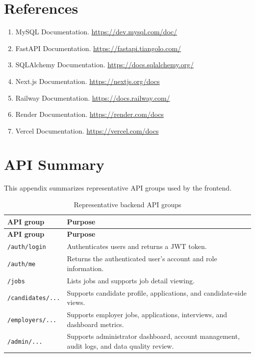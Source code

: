 \documentclass[12pt,a4paper]{report}
\begin{document}
\chapter*{References}

\begin{enumerate}[leftmargin=1.5cm]
  \item MySQL Documentation. \url{https://dev.mysql.com/doc/}
  \item FastAPI Documentation. \url{https://fastapi.tiangolo.com/}
  \item SQLAlchemy Documentation. \url{https://docs.sqlalchemy.org/}
  \item Next.js Documentation. \url{https://nextjs.org/docs}
  \item Railway Documentation. \url{https://docs.railway.com/}
  \item Render Documentation. \url{https://render.com/docs}
  \item Vercel Documentation. \url{https://vercel.com/docs}
\end{enumerate}

\appendix
\chapter{API Summary}

This appendix summarizes representative API groups used by the frontend.

\begin{longtable}{L{0.30\textwidth}L{0.60\textwidth}}
\caption{Representative backend API groups}\\
\toprule
\textbf{API group} & \textbf{Purpose} \\
\midrule
\endfirsthead
\toprule
\textbf{API group} & \textbf{Purpose} \\
\midrule
\endhead
\texttt{/auth/login} & Authenticates users and returns a JWT token. \\
\texttt{/auth/me} & Returns the authenticated user's account and role information. \\
\texttt{/jobs} & Lists jobs and supports job detail viewing. \\
\texttt{/candidates/...} & Supports candidate profile, applications, and candidate-side views. \\
\texttt{/employers/...} & Supports employer jobs, applications, interviews, and dashboard metrics. \\
\texttt{/admin/...} & Supports administrator dashboard, account management, audit logs, and data quality review. \\
\bottomrule
\end{longtable}
\end{document}

